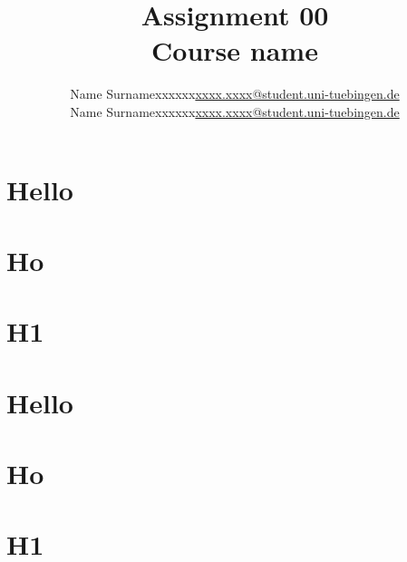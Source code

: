 \documentclass [a4paper, 11pt] {article}
\makeatletter
\newcommand{\homeworkNum}{00}
\newcommand{\studentOne}{Name Surname}
\newcommand{\studentTwo} {Name Surname}
\newcommand{\matrikelNrStOne}{xxxxxx}
\newcommand{\matrikelNrStTwo}{xxxxxx}
\newcommand{\mailStOne}{xxxx.xxxx@student.uni-tuebingen.de}
\newcommand{\mailStTwo}{xxxx.xxxx@student.uni-tuebingen.de}
\makeatother
\begin{document}
\title{\vspace{-1.5cm}\textbf{Assignment \homeworkNum} \\ 
	Course name}
\author{\begin{tabular}{lrl}
	\studentOne & \matrikelNrStOne & \href{mailto:\mailStOne}{\mailStOne} \\
	\studentTwo & \matrikelNrStTwo & \href{mailto:\mailStTwo}{\mailStTwo} 
\end{tabular}}	
\date{}
\maketitle

\section*{Hello}
\lipsum[1]

\section{Ho}
\lipsum[2]

\section{H1}
\lipsum[3]

\section{Hello}
\lipsum[4]

\section{Ho}
\lipsum[5]

\section{H1}
\lipsum[6]
\end{document}
